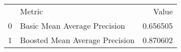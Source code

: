 \begin{tabular}{llr}
 & Metric & Value \\
0 & Basic Mean Average Precision & 0.656505 \\
1 & Boosted Mean Average Precision & 0.870602 \\
\end{tabular}
